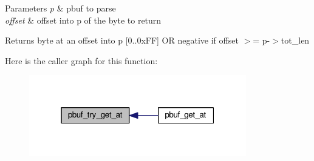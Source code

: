 \begin{DoxyParams}{Parameters}
{\em p} & pbuf to parse \\
\hline
{\em offset} & offset into p of the byte to return \\
\hline
\end{DoxyParams}
\begin{DoxyReturn}{Returns}
byte at an offset into p \mbox{[}0..0x\+FF\mbox{]} OR negative if \textquotesingle{}offset\textquotesingle{} $>$= p-\/$>$tot\+\_\+len 
\end{DoxyReturn}
Here is the caller graph for this function\+:
\nopagebreak
\begin{figure}[H]
\begin{center}
\leavevmode
\includegraphics[width=268pt]{group__pbuf_ga839f342803b0cf89049744124c5a98ad_icgraph}
\end{center}
\end{figure}

